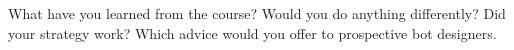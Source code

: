 What have you learned from the course? Would you do anything differently? Did your strategy work? Which advice would you offer to prospective bot designers.